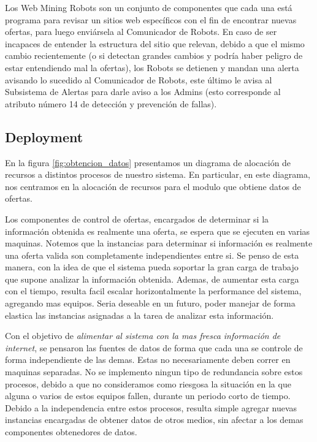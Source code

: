 Los \textsf{Web Mining Robots} son un conjunto de componentes que cada una está programa para revisar un sitios web específicos con el fin de encontrar nuevas ofertas, para luego enviársela al \textsf{Comunicador de Robots}. En caso de ser incapaces de entender la estructura del sitio que relevan, debido a que el mismo cambio recientemente (o si detectan grandes cambios y podría haber peligro de estar entendiendo mal la ofertas), los Robots se detienen y mandan una alerta avisando lo sucedido al \textsf{Comunicador de Robots}, este último le avisa al \textsf{Subsistema de Alertas} para darle aviso a los Admins (esto corresponde al atributo número 14 de detección y prevención de fallas).
\vspace{9pt}


\subsection{Deployment}

En la figura \ref{fig:obtencion_datos} presentamos un diagrama de alocación de recursos a distintos procesos de nuestro sistema. En particular, en este diagrama, nos centramos en la alocación de recursos para el modulo que obtiene datos de ofertas. 

Los componentes de control de ofertas, encargados de determinar si la información obtenida es realmente una oferta, se espera que se ejecuten en varias maquinas. Notemos que la instancias para determinar si información es realmente una oferta valida son completamente independientes entre si. Se penso de esta manera, con la idea de que el sistema pueda soportar la gran carga de trabajo que supone analizar la información obtenida. Ademas, de aumentar esta carga con el tiempo, resulta facil escalar horizontalmente la performance del sistema, agregando mas equipos. Seria deseable en un futuro, poder manejar de forma elastica las instancias asignadas a la tarea de analizar esta información.

Con el objetivo de \emph{alimentar al sistema con la mas fresca información de internet}, se pensaron las fuentes de datos de forma que cada una se controle de forma independiente de las demas. Estas no necesariamente deben correr en maquinas separadas. No se implemento ningun tipo de redundancia sobre estos procesos, debido a que no consideramos como riesgosa la situación en la que alguna o varios de estos equipos fallen, durante un periodo corto de tiempo. Debido a la independencia entre estos procesos, resulta simple agregar nuevas instancias encargadas de obtener datos de otros medios, sin afectar a los demas componentes obtenedores de datos.

